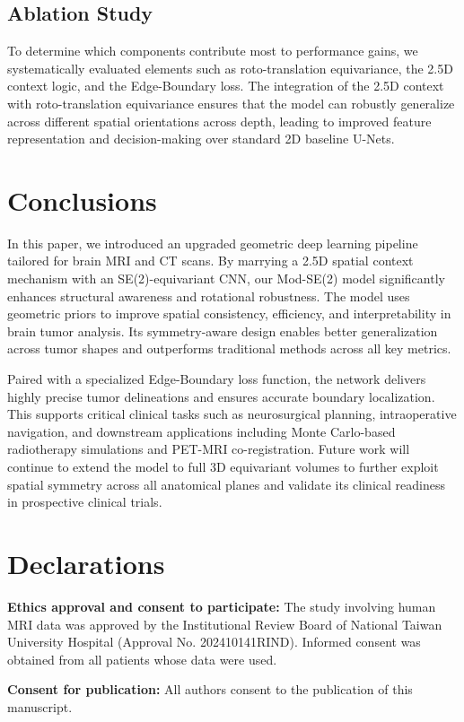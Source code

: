 \documentclass[10pt,twocolumn,letterpaper]{article}
\begin{document}
\subsection{Ablation Study}
To determine which components contribute most to performance gains, we systematically evaluated elements such as roto-translation equivariance, the 2.5D context logic, and the Edge-Boundary loss. The integration of the 2.5D context with roto-translation equivariance ensures that the model can robustly generalize across different spatial orientations across depth, leading to improved feature representation and decision-making over standard 2D baseline U-Nets.

\section{Conclusions}
In this paper, we introduced an upgraded geometric deep learning pipeline tailored for brain MRI and CT scans. By marrying a 2.5D spatial context mechanism with an SE(2)-equivariant CNN, our Mod-SE(2) model significantly enhances structural awareness and rotational robustness. The model uses geometric priors to improve spatial consistency, efficiency, and interpretability in brain tumor analysis. Its symmetry-aware design enables better generalization across tumor shapes and outperforms traditional methods across all key metrics. 

Paired with a specialized Edge-Boundary loss function, the network delivers highly precise tumor delineations and ensures accurate boundary localization. This supports critical clinical tasks such as neurosurgical planning, intraoperative navigation, and downstream applications including Monte Carlo-based radiotherapy simulations and PET-MRI co-registration. Future work will continue to extend the model to full 3D equivariant volumes to further exploit spatial symmetry across all anatomical planes and validate its clinical readiness in prospective clinical trials.

\section*{Declarations}
\textbf{Ethics approval and consent to participate:} The study involving human MRI data was approved by the Institutional Review Board of National Taiwan University Hospital (Approval No. 202410141RIND). Informed consent was obtained from all patients whose data were used.

\textbf{Consent for publication:} All authors consent to the publication of this manuscript.
\end{document}
